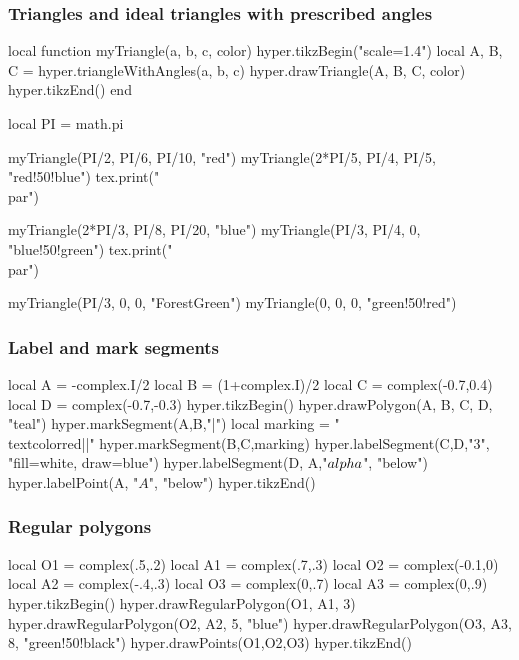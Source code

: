 \documentclass{article}
\begin{document}
\subsubsection{Triangles and ideal triangles with prescribed angles}
\begin{codeandresult}
\begin{luacode*}
local function myTriangle(a, b, c, color)
	hyper.tikzBegin("scale=1.4")
	local A, B, C = hyper.triangleWithAngles(a, b, c)
	hyper.drawTriangle(A, B, C, color)
	hyper.tikzEnd()
end

local PI = math.pi

myTriangle(PI/2, PI/6, PI/10, "red")
myTriangle(2*PI/5, PI/4, PI/5, "red!50!blue")
tex.print("\\par")

myTriangle(2*PI/3, PI/8, PI/20, "blue")
myTriangle(PI/3, PI/4, 0, "blue!50!green")
tex.print("\\par")

myTriangle(PI/3, 0, 0, "ForestGreen")
myTriangle(0, 0, 0, "green!50!red")
\end{luacode*}
\end{codeandresult}


\subsubsection{Label and mark segments}
\begin{codeandresult}
\begin{luacode*}
local A = -complex.I/2
local B = (1+complex.I)/2
local C = complex(-0.7,0.4)
local D = complex(-0.7,-0.3)
hyper.tikzBegin()
hyper.drawPolygon(A, B, C, D, "teal")
hyper.markSegment(A,B,"|")
local marking = "\\textcolor{red}{||}"
hyper.markSegment(B,C,marking)
hyper.labelSegment(C,D,"$3$", "fill=white, draw=blue")
hyper.labelSegment(D, A,"$\\alpha$", "below")
hyper.labelPoint(A, "$A$", "below")
hyper.tikzEnd()
\end{luacode*}
\end{codeandresult}


\subsubsection{Regular polygons}
\begin{codeandresult}
\begin{luacode*}
local O1 = complex(.5,.2)
local A1 = complex(.7,.3)
local O2 = complex(-0.1,0)
local A2 = complex(-.4,.3)
local O3 = complex(0,.7)
local A3 = complex(0,.9)
hyper.tikzBegin()
hyper.drawRegularPolygon(O1, A1, 3)
hyper.drawRegularPolygon(O2, A2, 5, "blue")
hyper.drawRegularPolygon(O3, A3, 8, "green!50!black")
hyper.drawPoints(O1,O2,O3)
hyper.tikzEnd()
\end{luacode*}
\end{codeandresult}
\end{document}

